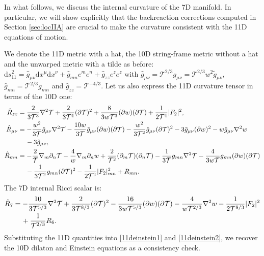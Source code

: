 \documentclass[11pt]{article}
\newcommand{\nl}{\notag \\ &\quad\,}
\renewcommand{\[}{\left[}
\renewcommand{\]}{\right]}
\renewcommand{\(}{\left(}
\renewcommand{\)}{\right)}
\renewcommand{\d}{\textrm{d}}
\newcommand{\<}{\langle}
\renewcommand{\>}{\rangle}
\begin{document}
In what follows, we discuss the internal curvature of the 7D manifold. In particular, we will show explicitly that the backreaction corrections computed in Section \ref{sec:locIIA} are crucial to make the curvature consistent with the 11D equations of motion.

We denote the 11D metric with a hat, the 10D string-frame metric without a hat and the unwarped metric with a tilde as before:
$\d s_{11}^2= \hat g_{\mu\nu} \d x^\mu \d x^\nu + \hat g_{mn} e^m e^n + \hat g_{zz}e^z e^z$ with $\hat g_{\mu\nu}= \mathcal{T}^{2/3} g_{\mu\nu} = \mathcal{T}^{2/3} w^2 \tilde g_{\mu\nu}$, $\hat g_{mn}=\mathcal{T}^{2/3} g_{mn}$ and $\hat g_{zz}=\mathcal{T}^{-4/3}$.
Let us also express the 11D curvature tensor in terms of the 10D one:
\begin{align}
\hat R_{zz} &= \frac{2}{3\mathcal{T}^3} \nabla^2 \mathcal{T} + \frac{2}{3\mathcal{T}^4} (\partial \mathcal{T})^2
 +\frac{8}{3w\mathcal{T}^3} (\partial w)(\partial \mathcal{T})
+ \frac{1}{2\mathcal{T}^4}|F_2|^2, \\
\hat R_{\mu\nu} &=  -\frac{w^2}{3\mathcal{T}}\tilde g_{\mu\nu} \nabla^2 \mathcal{T}
-\frac{10w}{3\mathcal{T}} \tilde g_{\mu\nu} (\partial w)(\partial \mathcal{T})
- \frac{w^2}{3\mathcal{T}^2} \tilde g_{\mu\nu}(\partial\mathcal{T})^2 
-3\tilde g_{\mu\nu} (\partial w)^2 -w\tilde g_{\mu\nu} \nabla^2 w \nl  -3 \tilde g_{\mu\nu}, \\
\hat R_{mn} &= -\frac{2}{\mathcal{T}} \nabla_m\partial_n \mathcal{T}
 -\frac{4}{w} \nabla_m\partial_n w
+\frac{2}{\mathcal{T}^2} (\partial_m\mathcal{T})( \partial_n \mathcal{T}) - \frac{1}{3\mathcal{T}}g_{mn} \nabla^2 \mathcal{T}
 - \frac{4}{3w\mathcal{T}}g_{mn} (\partial w)(\partial\mathcal{T}) \nl
- \frac{1}{3\mathcal{T}^2}g_{mn} (\partial \mathcal{T})^2  -\frac{1}{2\mathcal{T}^2}|F_2|^2_{mn} + R_{mn}.
\end{align}
The 7D internal Ricci scalar is:
\begin{align}
\hat R_7 &= -\frac{10}{3\mathcal{T}^{5/3}} \nabla^2 \mathcal{T} + \frac{2}{3\mathcal{T}^{8/3}} (\partial \mathcal{T})^2 
 - \frac{16}{3w\mathcal{T}^{5/3}} (\partial w)(\partial \mathcal{T}) - \frac{4}{w\mathcal{T}^{2/3}} \nabla^2 w 
-\frac{1}{2\mathcal{T}^{8/3}}|F_2|^2 \nl + \frac{1}{\mathcal{T}^{2/3}}R_6. \label{r7}
\end{align}
Substituting the 11D quantities into \eqref{11deinstein1} and \eqref{11deinstein2}, we recover the 10D dilaton and Einstein equations as a consistency check.
\end{document}
